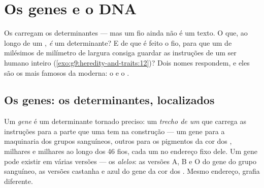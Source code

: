 \chapter{Os genes e o DNA}\label{ch:g9:genes-and-dna}

Os  carregam os determinantes --- mas um fio
ainda não é um texto. O que, ao longo de um ,
\emph{é} um determinante? E de que é feito o fio, para que um
 de milésimos de milímetro de largura consiga guardar
as instruções de um ser humano inteiro
(\cref{exo:g9:heredity-and-traits:12})? Dois nomes respondem,
e eles são os mais famosos da  moderna: o  e o
.

\section{Os genes: os determinantes, localizados}

\begin{definition}\label{def:g9:genes-and-dna:gene}
Um \emph{gene} é um determinante tornado
preciso: um \emph{trecho de um } que carrega as
instruções para a parte que uma  tem na
construção --- um gene para a maquinaria dos grupos
sanguíneos, outros para os pigmentos da cor dos ,
milhares e milhares ao longo dos 46 fios, cada um no endereço
fixo dele. Um gene pode existir em várias versões --- os
\emph{alelos}: as versões A, B e O do gene do
grupo sanguíneo, as versões castanha e azul do gene da cor
dos . Mesmo endereço, grafia diferente.
\end{definition}

